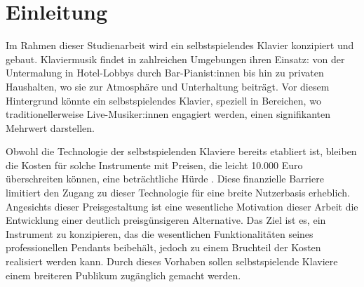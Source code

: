 
\chapter{Einleitung} \label{einleitung}

\nocite{*}

Im Rahmen dieser Studienarbeit wird ein selbstspielendes Klavier konzipiert und gebaut.
Klaviermusik findet in zahlreichen Umgebungen ihren Einsatz: von der Untermalung in Hotel-Lobbys durch Bar-Pianist:innen bis hin zu privaten Haushalten,
wo sie zur Atmosphäre und Unterhaltung beiträgt.
Vor diesem Hintergrund könnte ein selbstspielendes Klavier, speziell in Bereichen, wo traditionellerweise Live-Musiker:innen engagiert werden,
einen signifikanten Mehrwert darstellen.

Obwohl die Technologie der selbstspielenden Klaviere bereits etabliert ist, bleiben die Kosten für solche Instrumente mit Preisen,
die leicht 10.000 Euro überschreiten können, eine beträchtliche Hürde \cite*{YamahaU1}.
Diese finanzielle Barriere limitiert den Zugang zu dieser Technologie für eine breite Nutzerbasis erheblich.
Angesichts dieser Preisgestaltung ist eine wesentliche Motivation dieser Arbeit die Entwicklung einer deutlich preisgünsigeren Alternative.
Das Ziel ist es, ein Instrument zu konzipieren, das die wesentlichen Funktionalitäten seines professionellen Pendants beibehält,
jedoch zu einem Bruchteil der Kosten realisiert werden kann.
Durch dieses Vorhaben sollen selbstspielende Klaviere einem breiteren Publikum zugänglich gemacht werden.



